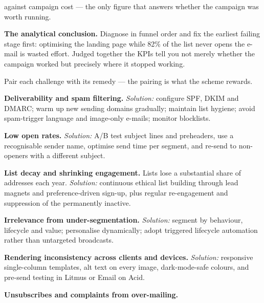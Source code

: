 \begin{qlist}
\begin{apts}
      against campaign cost --- the only figure that answers whether the campaign
      was worth running.
\item \textbf{The analytical conclusion.} Diagnose in funnel order and fix the
      earliest failing stage first: optimising the landing page while 82\% of
      the list never opens the e-mail is wasted effort. Judged together the KPIs
      tell you not merely whether the campaign worked but precisely where it
      stopped working.
\end{apts}

Pair each challenge with its remedy --- the pairing is what the scheme rewards.
\begin{apts}
\item \textbf{Deliverability and spam filtering.} \emph{Solution:} configure
      SPF, DKIM and DMARC; warm up new sending domains gradually; maintain list
      hygiene; avoid spam-trigger language and image-only e-mails; monitor
      blocklists.
\item \textbf{Low open rates.} \emph{Solution:} A/B test subject lines and
      preheaders, use a recognisable sender name, optimise send time per
      segment, and re-send to non-openers with a different subject.
\item \textbf{List decay and shrinking engagement.} Lists lose a substantial
      share of addresses each year. \emph{Solution:} continuous ethical list
      building through lead magnets and preference-driven sign-up, plus regular
      re-engagement and suppression of the permanently inactive.
\item \textbf{Irrelevance from under-segmentation.} \emph{Solution:} segment by
      behaviour, lifecycle and value; personalise dynamically; adopt triggered
      lifecycle automation rather than untargeted broadcasts.
\item \textbf{Rendering inconsistency across clients and devices.}
      \emph{Solution:} responsive single-column templates, alt text on every
      image, dark-mode-safe colours, and pre-send testing in Litmus or Email on
      Acid.
\item \textbf{Unsubscribes and complaints from over-mailing.}

\end{apts}
\end{qlist}

